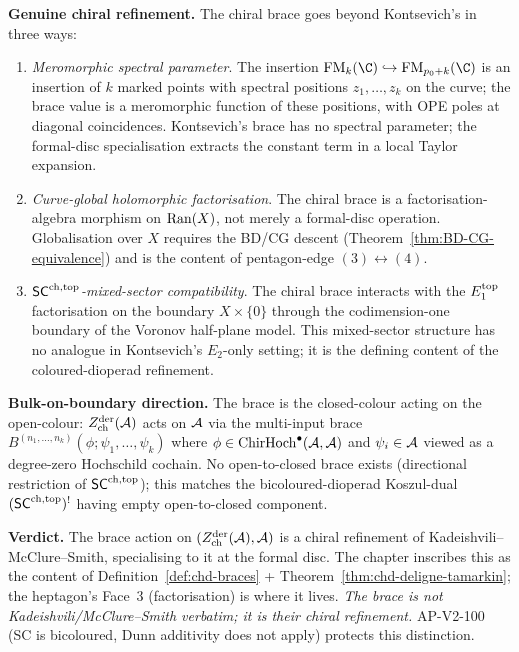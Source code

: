 \textbf{Genuine chiral refinement.} The chiral brace goes beyond Kontsevich's in three ways:
\begin{enumerate}[label=\textup{(\roman*)}]
\item \emph{Meromorphic spectral parameter}. The insertion $\FM_k(\C) \hookrightarrow \FM_{p_0 + k}(\C)$ is an insertion of $k$ marked points with spectral positions $z_1, \ldots, z_k$ on the curve; the brace value is a meromorphic function of these positions, with OPE poles at diagonal coincidences. Kontsevich's brace has no spectral parameter; the formal-disc specialisation extracts the constant term in a local Taylor expansion.
\item \emph{Curve-global holomorphic factorisation}. The chiral brace is a factorisation-algebra morphism on $\mathrm{Ran}(X)$, not merely a formal-disc operation. Globalisation over $X$ requires the BD/CG descent (Theorem~\ref*{thm:BD-CG-equivalence}) and is the content of pentagon-edge $(3) \leftrightarrow (4)$.
\item \emph{$\mathsf{SC}^{\mathrm{ch},\mathrm{top}}$-mixed-sector compatibility}. The chiral brace interacts with the $E_1^{\mathrm{top}}$ factorisation on the boundary $X \times \{0\}$ through the codimension-one boundary of the Voronov half-plane model. This mixed-sector structure has no analogue in Kontsevich's $E_2$-only setting; it is the defining content of the coloured-dioperad refinement.
\end{enumerate}

\textbf{Bulk-on-boundary direction.} The brace is the closed-colour acting on the open-colour: $Z^{\mathrm{der}}_{\mathrm{ch}}(\mathcal{A})$ acts on $\mathcal{A}$ via the multi-input brace $B^{(n_1, \ldots, n_k)}(\phi; \psi_1, \ldots, \psi_k)$ where $\phi \in \mathrm{ChirHoch}^\bullet(\mathcal{A}, \mathcal{A})$ and $\psi_i \in \mathcal{A}$ viewed as a degree-zero Hochschild cochain. No open-to-closed brace exists (directional restriction of $\mathsf{SC}^{\mathrm{ch},\mathrm{top}}$); this matches the bicoloured-dioperad Koszul-dual $(\mathsf{SC}^{\mathrm{ch},\mathrm{top}})^!$ having empty open-to-closed component.

\textbf{Verdict.} The brace action on $(Z^{\mathrm{der}}_{\mathrm{ch}}(\mathcal{A}), \mathcal{A})$ is a chiral refinement of Kadeishvili--McClure--Smith, specialising to it at the formal disc. The chapter inscribes this as the content of Definition~\ref*{def:chd-braces} + Theorem~\ref*{thm:chd-deligne-tamarkin}; the heptagon's Face~3 (factorisation) is where it lives. \emph{The brace is not Kadeishvili/McClure--Smith verbatim; it is their chiral refinement.} AP-V2-100 (SC is bicoloured, Dunn additivity does not apply) protects this distinction.

